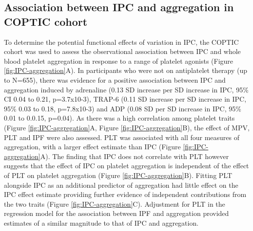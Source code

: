 \documentclass[11pt,twoside]{bristolthesis}
\begin{document}
\hypertarget{association-between-ipc-and-aggregation-in-coptic-cohort}{%
\subsection{Association between IPC and aggregation in COPTIC cohort}\label{association-between-ipc-and-aggregation-in-coptic-cohort}}

To determine the potential functional effects of variation in IPC, the COPTIC cohort was used to assess the observational association between IPC and whole blood platelet aggregation in response to a range of platelet agonists (Figure \ref{fig:IPC-aggregation}A). In participants who were not on antiplatelet therapy (up to N=655), there was evidence for a positive association between IPC and aggregation induced by adrenaline (0.13 SD increase per SD increase in IPC, 95\% CI 0.04 to 0.21, p=3.7x10-3), TRAP-6 (0.11 SD increase per SD increase in IPC, 95\% 0.03 to 0.18, p=7.8x10-3) and ADP (0.08 SD per SD increase in IPC, 95\% 0.01 to 0.0.15, p=0.04). As there was a high correlation among platelet traits (Figure \ref{fig:IPC-aggregation}A, Figure \ref{fig:IPC-aggregation}B), the effect of MPV, PLT and IPF were also assessed. PLT was associated with all four measures of aggregation, with a larger effect estimate than IPC (Figure \ref{fig:IPC-aggregation}A). The finding that IPC does not correlate with PLT however suggests that the effect of IPC on platelet aggregation is independent of the effect of PLT on platelet aggregation (Figure \ref{fig:IPC-aggregation}B). Fitting PLT alongside IPC as an additional predictor of aggregation had little effect on the IPC effect estimate providing further evidence of independent contributions from the two traits (Figure \ref{fig:IPC-aggregation}C). Adjustment for PLT in the regression model for the association between IPF and aggregation provided estimates of a similar magnitude to that of IPC and aggregation.
\end{document}
